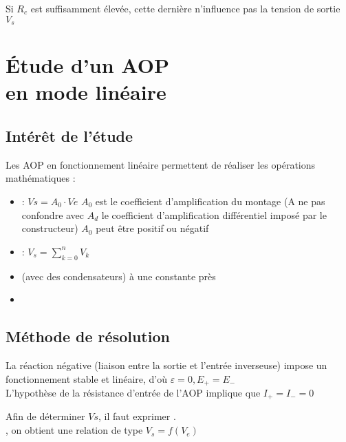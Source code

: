 Si $R_{c}$ est suffisamment élevée, cette dernière n’influence pas la tension de sortie $V_s$ \\





\chapter{Étude d’un AOP \\en mode linéaire}
\section{Intérêt de l’étude }

Les AOP en fonctionnement linéaire permettent de réaliser les opérations mathématiques :

\begin{itemize}
  \item {} : $Vs=A_0 \cdot Ve$
  $A_0$ est le coefficient d’amplification du montage (A ne pas confondre avec $A_d$ le coefficient d’amplification différentiel imposé par le constructeur)
  $A_0$ peut être positif ou négatif
  \item {} : $V_s=\sum_{k=0}^{n} V_k$
  \item {} (avec des condensateurs) à une constante près
  \item {}
\end{itemize}

\section{Méthode de résolution}
La {\color{red}réaction négative} (liaison entre la sortie et l’entrée inverseuse) impose un fonctionnement stable et linéaire, d'où {\color{red}$\varepsilon=0, E_+=E_-$} \\

L’hypothèse de la résistance d’entrée de l’AOP implique que $I_+=I_-=0$

Afin de déterminer $Vs$, il faut exprimer . \\

, on obtient une relation de type $V_s = f(V_e)$




